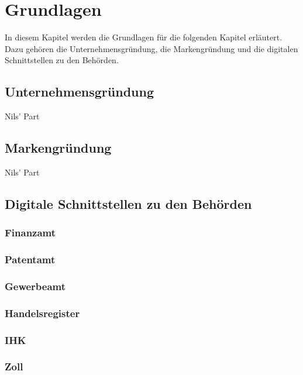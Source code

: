 \newpage

\section{Grundlagen} \label{grundlagen}
In diesem Kapitel werden die Grundlagen für die folgenden Kapitel erläutert. Dazu gehören die Unternehmensgründung, die Markengründung und die digitalen Schnittstellen zu den Behörden.
\subsection{Unternehmensgründung} \label{unternehmensgründung}

Nils' Part
\subsection{Markengründung} \label{markengründung}

Nils' Part

\subsection{Digitale Schnittstellen zu den Behörden} \label{digitaleBehoerden}

\subsubsection{Finanzamt} \label{finanzamt}

\subsubsection{Patentamt} \label{patentamt}

\subsubsection{Gewerbeamt} \label{gewerbeamt}

\subsubsection{Handelsregister} \label{handelsregister}

\subsubsection{IHK} \label{ihk}

\subsubsection{Zoll} \label{zoll}

